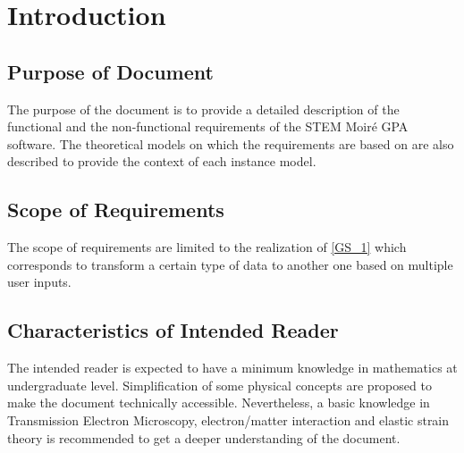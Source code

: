 \documentclass[12pt]{article}
\newcommand{\progname}{STEM Moir{\'e} GPA}
\begin{document}

\newpage
{}

\section{Introduction}




\subsection{Purpose of Document}

The purpose of the document is to provide a detailed description of the functional and the non-functional requirements of the \progname{} software.  The theoretical models on which the requirements are based on are also described to provide the context of each instance model.

\subsection{Scope of Requirements} 

The scope of requirements are limited to the realization of \cref{GS_1} which corresponds to transform a certain type of data to another one based on multiple user inputs.

\subsection{Characteristics of Intended Reader} 

The intended reader is expected to have a minimum knowledge in mathematics at undergraduate level. Simplification of some physical concepts are proposed to make the document technically accessible. Nevertheless, a basic knowledge in Transmission Electron Microscopy, electron/matter interaction and elastic strain theory is recommended to get a deeper understanding of the document. 
\end{document}
